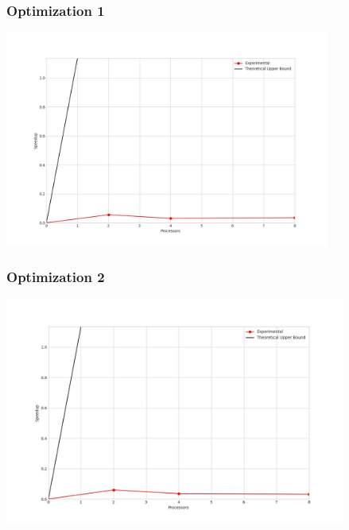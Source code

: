 \subsubsection{Optimization 1}
\begin{center}
    \resizebox{0.95\textwidth}{!}{}
    \includegraphics[width=0.8\textwidth]{../img/speedup-graph_type-fully-disconnected-1000000-O1}
\end{center}

\clearpage
\subsubsection{Optimization 2}
\begin{center}
    \resizebox{0.95\textwidth}{!}{}
    \includegraphics[width=0.84\textwidth]{../img/speedup-graph_type-fully-disconnected-1000000-O2}
\end{center}

